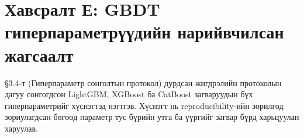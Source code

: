 \section*{Хавсралт Е: GBDT гиперпараметрүүдийн нарийвчилсан жагсаалт}
\label{app:hyperparams}
\renewcommand{\thetable}{Е.\arabic{table}}
\renewcommand{\thefigure}{Е.\arabic{figure}}
\setcounter{table}{0}
\setcounter{figure}{0}

\S3.4-т (Гиперпараметр сонголтын протокол) дурдсан жигдрэлийн протоколын дагуу сонгогдсон LightGBM, XGBoost ба CatBoost загваруудын бүх гиперпараметрийг  хүснэгтэд нэгтгэв. Хүснэгт нь reproducibility-ийн зорилгод зориулагдсан бөгөөд параметр тус бүрийн утга ба үүргийг загвар бүрд харьцуулан харуулав.

